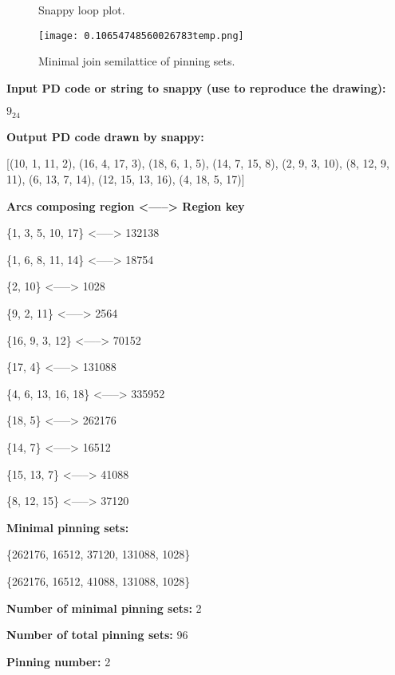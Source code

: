 \documentclass{article}%
\begin{document}
\begin{multicols}{2}
\begin{figure}[H]
\centering

\caption{Snappy loop plot.}
\label{fig:0.8791491616957421temp.svg}
\end{figure}\columnbreak

\begin{figure}[H]
\centering
\texttt{[image: 0.10654748560026783temp.png]}
\caption{Minimal join semilattice of pinning sets.}
\label{fig:0.10654748560026783temp.png}
\end{figure}\end{multicols}\newpage\begin{multicols}{2}
\textbf{Input PD code or string to snappy (use to reproduce the drawing):}

	$9_24$

\textbf{Output PD code drawn by snappy:}

	[(10, 1, 11, 2), (16, 4, 17, 3), (18, 6, 1, 5), (14, 7, 15, 8), (2, 9, 3, 10), (8, 12, 9, 11), (6, 13, 7, 14), (12, 15, 13, 16), (4, 18, 5, 17)]


\textbf{Arcs composing region <-----> Region key}

\{{1, 3, 5, 10, 17}\} <-----> 132138

\{{1, 6, 8, 11, 14}\} <-----> 18754

\{{2, 10}\} <-----> 1028

\{{9, 2, 11}\} <-----> 2564

\{{16, 9, 3, 12}\} <-----> 70152

\{{17, 4}\} <-----> 131088

\{{4, 6, 13, 16, 18}\} <-----> 335952

\{{18, 5}\} <-----> 262176

\{{14, 7}\} <-----> 16512

\{{15, 13, 7}\} <-----> 41088

\{{8, 12, 15}\} <-----> 37120


\columnbreak

\textbf{Minimal pinning sets:}

\{{262176, 16512, 37120, 131088, 1028}\}

\{{262176, 16512, 41088, 131088, 1028}\}



\textbf{Number of minimal pinning sets:} 2

\textbf{Number of total pinning sets:} 96

\textbf{Pinning number:} 2


\end{multicols}
\end{document}
